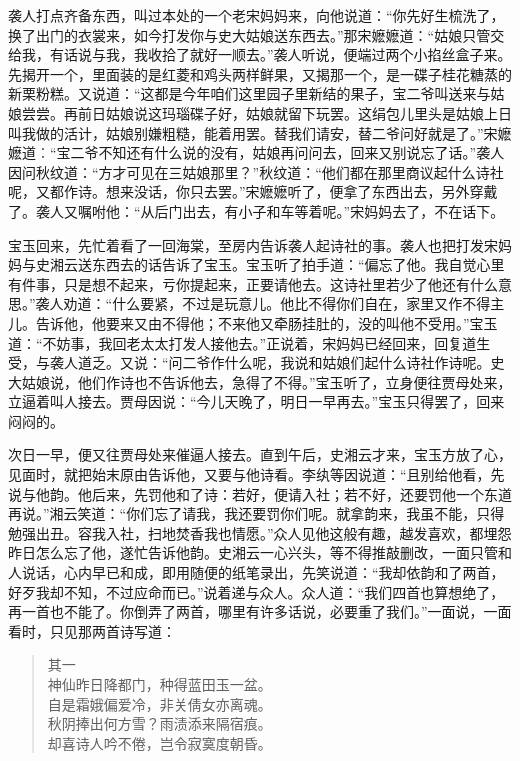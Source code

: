 \documentclass[12pt,oneside]{book}
\newenvironment{shici}{%
\begin{verse}%
\centering\large\hspace{12pt}}%
{\end{verse}}
\begin{document}
袭人打点齐备东西，叫过本处的一个老宋妈妈来，向他说道：“你先好生梳洗了，换了出门的衣裳来，如今打发你与史大姑娘送东西去。”那宋嬷嬷道：“姑娘只管交给我，有话说与我，我收拾了就好一顺去。”袭人听说，便端过两个小掐丝盒子来。先揭开一个，里面装的是红菱和鸡头两样鲜果，又揭那一个，是一碟子桂花糖蒸的新栗粉糕。又说道：“这都是今年咱们这里园子里新结的果子，宝二爷叫送来与姑娘尝尝。再前日姑娘说这玛瑙碟子好，姑娘就留下玩罢。这绢包儿里头是姑娘上日叫我做的活计，姑娘别嫌粗糙，能着用罢。替我们请安，替二爷问好就是了。”宋嬷嬷道︰“宝二爷不知还有什么说的没有，姑娘再问问去，回来又别说忘了话。”袭人因问秋纹道：“方才可见在三姑娘那里？”秋纹道：“他们都在那里商议起什么诗社呢，又都作诗。想来没话，你只去罢。”宋嬷嬷听了，便拿了东西出去，另外穿戴了。袭人又嘱咐他：“从后门出去，有小子和车等着呢。”宋妈妈去了，不在话下。

宝玉回来，先忙着看了一回海棠，至房内告诉袭人起诗社的事。袭人也把打发宋妈妈与史湘云送东西去的话告诉了宝玉。宝玉听了拍手道：“偏忘了他。我自觉心里有件事，只是想不起来，亏你提起来，正要请他去。这诗社里若少了他还有什么意思。”袭人劝道：“什么要紧，不过是玩意儿。他比不得你们自在，家里又作不得主儿。告诉他，他要来又由不得他；不来他又牵肠挂肚的，没的叫他不受用。”宝玉道：“不妨事，我回老太太打发人接他去。”正说着，宋妈妈已经回来，回复道生受，与袭人道乏。又说：“问二爷作什么呢，我说和姑娘们起什么诗社作诗呢。史大姑娘说，他们作诗也不告诉他去，急得了不得。”宝玉听了，立身便往贾母处来，立逼着叫人接去。贾母因说：“今儿天晚了，明日一早再去。”宝玉只得罢了，回来闷闷的。

次日一早，便又往贾母处来催逼人接去。直到午后，史湘云才来，宝玉方放了心，见面时，就把始末原由告诉他，又要与他诗看。李纨等因说道：“且别给他看，先说与他韵。他后来，先罚他和了诗：若好，便请入社；若不好，还要罚他一个东道再说。”湘云笑道：“你们忘了请我，我还要罚你们呢。就拿韵来，我虽不能，只得勉强出丑。容我入社，扫地焚香我也情愿。”众人见他这般有趣，越发喜欢，都埋怨昨日怎么忘了他，遂忙告诉他韵。史湘云一心兴头，等不得推敲删改，一面只管和人说话，心内早已和成，即用随便的纸笔录出，先笑说道：“我却依韵和了两首，好歹我却不知，不过应命而已。”说着递与众人。众人道：“我们四首也算想绝了，再一首也不能了。你倒弄了两首，哪里有许多话说，必要重了我们。”一面说，一面看时，只见那两首诗写道：

\begin{shici}
其一\\
神仙昨日降都门，种得蓝田玉一盆。\\
自是霜娥偏爱冷，非关倩女亦离魂。\\
秋阴捧出何方雪？雨渍添来隔宿痕。\\
却喜诗人吟不倦，岂令寂寞度朝昏。
\end{shici}
\end{document}
